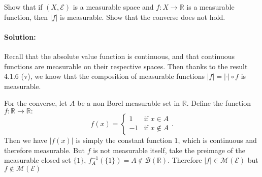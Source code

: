 \documentclass{article}
\begin{document}
\begin{exe}
    Show that if $(X,\mathcal{E})$ is a measurable space and $f:X\to \mathbb{R}$ is a measurable function, then $|f|$ is measurable. Show that the converse does not hold.
\end{exe}
\paragraph{Solution: } Recall that the absolute value function is continuous, and that continuous functions are measurable on their respective spaces. Then thanks to the result 4.1.6 (v), we know that the composition of measurable functions $|f|=|\cdot |\circ f$ is measurable.

For the converse, let $A$ be a non Borel measurable set in $\mathbb{R}$. Define the function $f:\mathbb{R}\to \mathbb{R}:$
\[
f(x)=\begin{cases}
    1&\text{if }x\in A\\
    -1&\text{if }x\not\in A
\end{cases}
.\] 
Then we have $|f(x)|$ is simply the constant function $1$, which is continuous and therefore measurable. But $f$ is not measurable itself, take the preimage of the measurable closed set $\{1\} $, $f_A^{-1}(\{1\} )=A\not\in \mathcal{B}(\mathbb{R})$. Therefore $|f|\in \mathcal{M}(\mathcal{E})$ but $f\not\in \mathcal{M}(\mathcal{E})$
\end{document}
